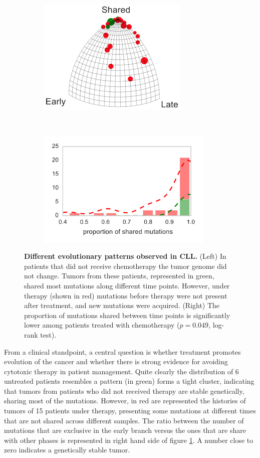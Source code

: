 \documentclass[a4paper,11pt]{article}
\begin{document}
\begin{figure}
    \begin{subfigure}{0.5\linewidth}
    \centering
    \includegraphics[height=2.2in]{../figures/CLL_triplet.png}
    \end{subfigure}
    ~
    \begin{subfigure}{0.5\linewidth}
    \centering
    \includegraphics[height=2.2in]{../figures/CLL_histogram.pdf}
    \end{subfigure}

    \caption{{\bf Different evolutionary patterns observed in CLL.} (Left) In patients that did not receive chemotherapy the tumor genome did not change. Tumors from these patients, represented in green, shared most mutations along different time points. However, under therapy (shown in red) mutations before therapy were not present after treatment, and new mutations were acquired. (Right) The proportion of mutations shared between time points is significantly lower among patients treated with chemotherapy ($p = 0.049$, log-rank test).}
    \label{fig:chemoCLL}
\end{figure}

From a clinical standpoint, a central question is whether treatment promotes evolution of the cancer and whether there is strong evidence for avoiding cytotoxic therapy in patient management.
Quite clearly the distribution of 6 untreated patients resembles a pattern (in green) forms a tight cluster, indicating that tumors from patients who did not received therapy are stable genetically, sharing most of the mutations.
However, in red are represented the histories of tumors of 15 patients under therapy, presenting some mutations at different times that are not shared across different samples.
The ratio between the number of mutations that are exclusive in the early branch versus the ones that are share with other phases is represented in right hand side of figure \ref{fig:chemoCLL}.
A number close to zero indicates a genetically stable tumor.
\end{document}
